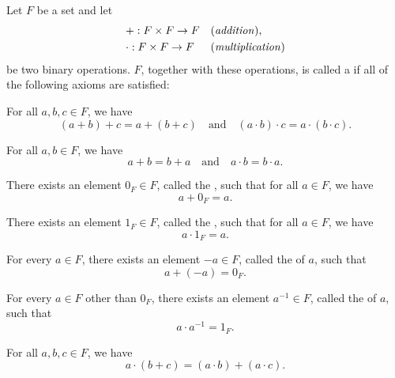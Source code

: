 \begin{definition}
Let $ F $ be a set and let
\begin{align*}
    & +:F\times F\to F && \text{(\emph{addition})}, \\
    & \cdot:F\times F\to F && \text{(\emph{multiplication})}
\end{align*}
be two binary operations. $ F $, together with these operations, is called a  if all of the following axioms are satisfied:
\begin{enumerate}
    For all $ a,b,c\in F $, we have
    \begin{equation*}
        (a+b)+c=a+(b+c) \quad\text{and}\quad (a\cdot b)\cdot c=a\cdot(b\cdot c).
    \end{equation*}

    For all $ a,b\in F $, we have
    \begin{equation*}
        a+b=b+a \quad\text{and}\quad a\cdot b=b\cdot a.
    \end{equation*}

    There exists an element $ 0_F\in F $, called the , such that for all $ a\in F $, we have
    \begin{equation*}
        a+0_F=a.
    \end{equation*}

    There exists an element $ 1_F\in F $, called the , such that for all $ a\in F $, we have
    \begin{equation*}
        a\cdot 1_F=a.
    \end{equation*}

    For every $ a\in F $, there exists an element $ -a\in F $, called the  of $ a $, such that
    \begin{equation*}
        a+(-a)=0_F.
    \end{equation*}

    For every $ a\in F $ other than $ 0_F $, there exists an element $ a^{-1}\in F $, called the  of $ a $, such that
    \begin{equation*}
        a\cdot a^{-1}=1_F.
    \end{equation*}

    For all $ a,b,c\in F $, we have
    \begin{equation*}
        a\cdot(b+c)=(a\cdot b)+(a\cdot c).
    \end{equation*}
\end{enumerate}
\end{definition}

